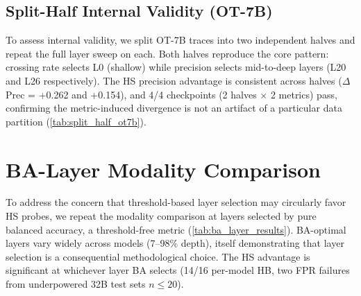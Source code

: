\subsection{Split-Half Internal Validity (OT-7B)}
\label{app:split_half}

To assess internal validity, we split OT-7B traces into two independent halves and repeat the full layer sweep on each. Both halves reproduce the core pattern: crossing rate selects L0 (shallow) while precision selects mid-to-deep layers (L20 and L26 respectively). The HS precision advantage is consistent across halves ($\Delta$Prec = +0.262 and +0.154), and 4/4 checkpoints (2 halves $\times$ 2 metrics) pass, confirming the metric-induced divergence is not an artifact of a particular data partition (\cref{tab:split_half_ot7b}).

\begin{table}[htbp]
\centering
\small
\caption{Split-half internal validity on OT-7B. Both halves reproduce CR$\to$shallow / threshold$\to$deep divergence with consistent HS advantage direction.}
\label{tab:split_half_ot7b}
\end{table}


\section{BA-Layer Modality Comparison}
\label{app:ba_layer_comparison}

To address the concern that threshold-based layer selection may circularly favor HS probes, we repeat the modality comparison at layers selected by pure balanced accuracy, a threshold-free metric (\cref{tab:ba_layer_results}). BA-optimal layers vary widely across models (7--98\% depth), itself demonstrating that layer selection is a consequential methodological choice. The HS advantage is significant at whichever layer BA selects (14/16 per-model HB, two FPR failures from underpowered 32B test sets $n{\leq}20$).

